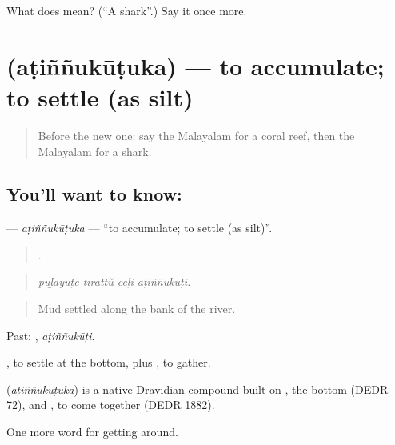 \begin{tcolorbox}[breakable,colback=teal!4,colframe=teal!35!black,title={Before you move on}]
What does  mean? (\textquotedblleft{}A shark\textquotedblright{}.) Say it once more.
\end{tcolorbox}
\section[\texorpdfstring{\ml{അടിഞ്ഞുകൂടുക} (aṭiññukūṭuka)}{അടിഞ്ഞുകൂടുക (aṭiññukūṭuka)}]{ (aṭiññukūṭuka) — to accumulate; to settle (as silt)}

\label{lesson:ML-C498-atinnukutuka}



\begin{quote}
Before the new one: say the Malayalam for a coral reef, then the Malayalam for a shark.
\end{quote}

\subsection*{You'll want to know: }
\textbf{} — \emph{aṭiññukūṭuka} — \textquotedblleft{}to accumulate; to settle (as silt)\textquotedblright{}.

\begin{quote}
   .
\end{quote}

\begin{quote}
\emph{puḻayuṭe tīrattŭ ceḷi aṭiññukūṭi.}
\end{quote}

\begin{quote}
Mud settled along the bank of the river.
\end{quote}

Past: , \emph{aṭiññukūṭi}.

, to settle at the bottom, plus , to gather.

\begin{cousinweb}
\textbf{} (\emph{aṭiññukūṭuka}) is a native Dravidian compound built on , the bottom (DEDR 72), and , to come together (DEDR 1882).
\end{cousinweb}

\begin{grammarlens}[title={What you've built}]
One more word for getting around.
\end{grammarlens}

